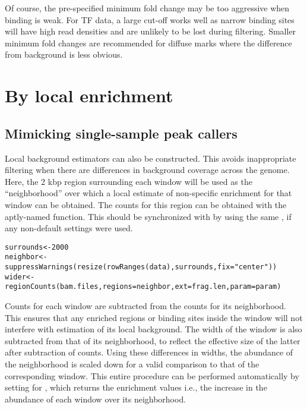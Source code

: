\documentclass{report}\usepackage[]{graphicx}\usepackage[usenames,dvipsnames]{color}
\newcommand{\hlnum}[1]{\textcolor[rgb]{0.816,0.125,0.439}{#1}}%
\newcommand{\hlstr}[1]{\textcolor[rgb]{0.251,0.627,0.251}{#1}}%
\newcommand{\hlstd}[1]{\textcolor[rgb]{0.251,0.251,0.251}{#1}}%
\newcommand{\hlkwb}[1]{\textcolor[rgb]{0,0,0}{#1}}%
\newcommand{\hlkwc}[1]{\textcolor[rgb]{0.251,0.251,0.251}{#1}}%
\newcommand{\hlkwd}[1]{\textcolor[rgb]{0.878,0.439,0.125}{#1}}%
\newenvironment{knitrout}{}{} %
\begin{document}
Of course, the pre-specified minimum fold change may be too aggressive when binding is weak. 
For TF data, a large cut-off works well as narrow binding sites will have high read densities and are unlikely to be lost during filtering. 
Smaller minimum fold changes are recommended for diffuse marks where the difference from background is less obvious. 

\section{By local enrichment}

\subsection{Mimicking single-sample peak callers}
Local background estimators can also be constructed.
This avoids inappropriate filtering when there are differences in background coverage across the genome. 
Here, the 2 kbp region surrounding each window will be used as the ``neighborhood'' over which a local estimate of non-specific enrichment for that window can be obtained. 
The counts for this region can be obtained with the aptly-named  function.
This should be synchronized with  by using the same , if any non-default settings were used.

\begin{knitrout}
\color{fgcolor}\begin{kframe}
\begin{alltt}
\hlstd{surrounds} \hlkwb{<-} \hlnum{2000}
\hlstd{neighbor} \hlkwb{<-} \hlkwd{suppressWarnings}\hlstd{(}\hlkwd{resize}\hlstd{(}\hlkwd{rowRanges}\hlstd{(data), surrounds,} \hlkwc{fix}\hlstd{=}\hlstr{"center"}\hlstd{))}
\hlstd{wider} \hlkwb{<-} \hlkwd{regionCounts}\hlstd{(bam.files,} \hlkwc{regions}\hlstd{=neighbor,} \hlkwc{ext}\hlstd{=frag.len,} \hlkwc{param}\hlstd{=param)}
\end{alltt}
\end{kframe}
\end{knitrout}

Counts for each window are subtracted from the counts for its neighborhood.
This ensures that any enriched regions or binding sites inside the window will not interfere with estimation of its local background.
The width of the window is also subtracted from that of its neighborhood, to reflect the effective size of the latter after subtraction of counts.
Using these differences in widths, the abundance of the neighborhood is scaled down for a valid comparison to that of the corresponding window.
This entire procedure can be performed automatically by setting  for , which returns the enrichment values i.e., the increase in the abundance of each window over its neighborhood.
\end{document}
